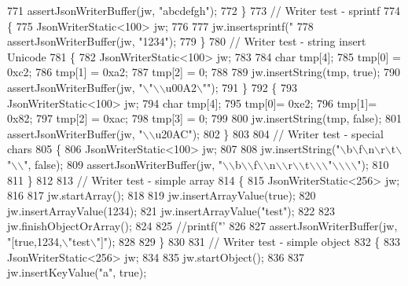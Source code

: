 \begin{DoxyCode}
{{{{{{771         assertJsonWriterBuffer(jw, \textcolor{stringliteral}{"abcdefgh"});
772     \}
773     \textcolor{comment}{// Writer test - sprintf}
774     \{
775         JsonWriterStatic<100> jw;
776 
777         jw.insertsprintf(\textcolor{stringliteral}{"%
778         assertJsonWriterBuffer(jw, \textcolor{stringliteral}{"1234"});
779     \}
780     \textcolor{comment}{// Writer test - string insert Unicode}
781     \{
782         JsonWriterStatic<100> jw;
783 
784         \textcolor{keywordtype}{char} tmp[4];
785         tmp[0] = 0xc2;
786         tmp[1] = 0xa2;
787         tmp[2] = 0;
788 
789         jw.insertString(tmp, \textcolor{keyword}{true});
790         assertJsonWriterBuffer(jw, \textcolor{stringliteral}{"\(\backslash\)"\(\backslash\)\(\backslash\)u00A2\(\backslash\)""});
791     \}
792     \{
793         JsonWriterStatic<100> jw;
794         \textcolor{keywordtype}{char} tmp[4];
795         tmp[0]= 0xe2;
796         tmp[1]= 0x82;
797         tmp[2] = 0xac;
798         tmp[3] = 0;
799 
800         jw.insertString(tmp, \textcolor{keyword}{false});
801         assertJsonWriterBuffer(jw, \textcolor{stringliteral}{"\(\backslash\)\(\backslash\)u20AC"});
802     \}
803 
804     \textcolor{comment}{// Writer test - special chars}
805     \{
806         JsonWriterStatic<100> jw;
807 
808         jw.insertString(\textcolor{stringliteral}{"\(\backslash\)b\(\backslash\)f\(\backslash\)n\(\backslash\)r\(\backslash\)t\(\backslash\)"\(\backslash\)\(\backslash\)"}, \textcolor{keyword}{false});
809         assertJsonWriterBuffer(jw, \textcolor{stringliteral}{"\(\backslash\)\(\backslash\)b\(\backslash\)\(\backslash\)f\(\backslash\)\(\backslash\)n\(\backslash\)\(\backslash\)r\(\backslash\)\(\backslash\)t\(\backslash\)\(\backslash\)\(\backslash\)"\(\backslash\)\(\backslash\)\(\backslash\)\(\backslash\)"});
810 
811     \}
812 
813     \textcolor{comment}{// Writer test - simple array}
814     \{
815         JsonWriterStatic<256> jw;
816 
817         jw.startArray();
818 
819         jw.insertArrayValue(\textcolor{keyword}{true});
820         jw.insertArrayValue(1234);
821         jw.insertArrayValue(\textcolor{stringliteral}{"test"});
822 
823         jw.finishObjectOrArray();
824 
825         \textcolor{comment}{//printf("'%
826 
827         assertJsonWriterBuffer(jw, \textcolor{stringliteral}{"[true,1234,\(\backslash\)"test\(\backslash\)"]"});
828 
829     \}
830 
831     \textcolor{comment}{// Writer test - simple object}
832     \{
833         JsonWriterStatic<256> jw;
834 
835         jw.startObject();
836 
837         jw.insertKeyValue(\textcolor{stringliteral}{"a"}, \textcolor{keyword}{true});
}}}}}}}}
\end{DoxyCode}
